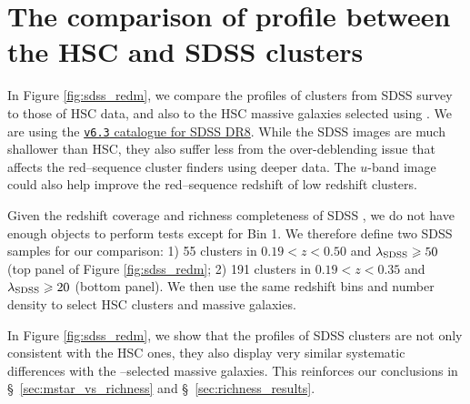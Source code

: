\documentclass[fleqn,usenatbib,useAMS]{mnras}
\begin{document}
\section{The comparison of \texorpdfstring{\dsigma{}}{DSigma} profile between the HSC and SDSS \texorpdfstring{\redm{}}{redMaPPer} clusters}
	\label{app:sdss_redm}

    In Figure \ref{fig:sdss_redm}, we compare the \dsigma{} profiles of \redm{} clusters from SDSS
    survey to those of HSC data, and also to the HSC massive galaxies selected using .
    We are using the \href{http://risa.stanford.edu/redmapper/}{\texttt{v6.3} catalogue for SDSS DR8}.
    While the SDSS images are much shallower than HSC, they also suffer less from the over-deblending
    issue that affects the red--sequence cluster finders using deeper data.
    The $u$-band image could also help improve the red--sequence redshift of low redshift clusters.
    
    Given the redshift coverage and richness completeness of SDSS \redm{}, we do not have enough 
    objects to perform \topn{} tests except for Bin 1. 
    We therefore define two SDSS \redm{} samples for our comparison: 
    1) 55 clusters in $0.19 < z < 0.50$ and $\lambda_{\rm SDSS} \geq 50$ (top panel of Figure 
    \ref{fig:sdss_redm}; 
    2) 191 clusters in $0.19 < z < 0.35$ and $\lambda_{\rm SDSS} \geq 20$ (bottom panel).
    We then use the same redshift bins and number density to select HSC \redm{} clusters and 
    massive galaxies.
    
    In Figure \ref{fig:sdss_redm}, we show that the \dsigma{} profiles of SDSS \redm{} clusters are
    not only consistent with the HSC \redm{} ones, they also display very similar systematic 
    differences with the --selected massive galaxies.
    This reinforces our conclusions in \S\ \ref{sec:mstar_vs_richness} and 
    \S\ \ref{sec:richness_results}.
\end{document}
